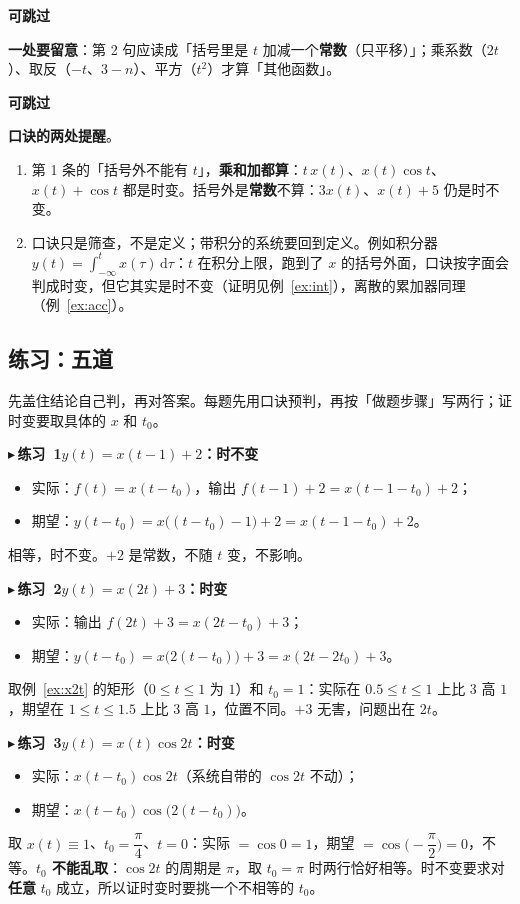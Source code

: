 \documentclass[UTF8,a4paper,11pt]{ctexart}
\newenvironment{skippable}{\begin{skipbox}\textbf{可跳过}\par\smallskip}{\end{skipbox}}
\newcounter{ex}[section]
\newcommand{\point}[1]{\par\addvspace{1ex}\noindent\textcolor{ptteal}{$\blacktriangleright$\,\textbf{#1}}\ }
\begin{document}
\begin{skippable}
\textbf{一处要留意}：第 2 句应读成「括号里是 $t$ 加减一个\textbf{常数}（只平移）」；乘系数（$2t$）、取反（$-t$、$3-n$）、平方（$t^2$）才算「其他函数」。
\end{skippable}

\begin{skippable}
\textbf{口诀的两处提醒}。
\begin{enumerate}[nosep]
\item 第 1 条的「括号外不能有 $t$」，\textbf{乘和加都算}：$t\,x(t)$、$x(t)\cos t$、$x(t)+\cos t$ 都是时变。括号外是\textbf{常数}不算：$3x(t)$、$x(t)+5$ 仍是时不变。
\item 口诀只是筛查，不是定义；带积分的系统要回到定义。例如积分器 $y(t)=\displaystyle\int_{-\infty}^{t}x(\tau)\,\mathrm{d}\tau$：$t$ 在积分上限，跑到了 $x$ 的括号外面，口诀按字面会判成时变，但它其实是时不变（证明见例~\ref{ex:int}），离散的累加器同理（例~\ref{ex:acc}）。
\end{enumerate}
\end{skippable}


\subsection{练习：五道}
先盖住结论自己判，再对答案。每题先用口诀预判，再按「做题步骤」写两行；证时变要取具体的 $x$ 和 $t_0$。

\point{练习~1\quad$y(t)=x(t-1)+2$：时不变}
\begin{itemize}[nosep]
\item 实际：$f(t)=x(t-t_0)$，输出 $f(t-1)+2=x(t-1-t_0)+2$；
\item 期望：$y(t-t_0)=x\bigl((t-t_0)-1\bigr)+2=x(t-1-t_0)+2$。
\end{itemize}
相等，时不变。$+2$ 是常数，不随 $t$ 变，不影响。

\point{练习~2\quad$y(t)=x(2t)+3$：时变}
\begin{itemize}[nosep]
\item 实际：输出 $f(2t)+3=x(2t-t_0)+3$；
\item 期望：$y(t-t_0)=x\bigl(2(t-t_0)\bigr)+3=x(2t-2t_0)+3$。
\end{itemize}
取例~\ref{ex:x2t} 的矩形（$0\le t\le1$ 为 $1$）和 $t_0=1$：实际在 $0.5\le t\le1$ 上比 $3$ 高 $1$，期望在 $1\le t\le1.5$ 上比 $3$ 高 $1$，位置不同。$+3$ 无害，问题出在 $2t$。

\point{练习~3\quad$y(t)=x(t)\cos 2t$：时变}
\begin{itemize}[nosep]
\item 实际：$x(t-t_0)\cos2t$（系统自带的 $\cos2t$ 不动）；
\item 期望：$x(t-t_0)\cos\bigl(2(t-t_0)\bigr)$。
\end{itemize}
取 $x(t)\equiv1$、$t_0=\dfrac{\pi}{4}$、$t=0$：实际 $=\cos0=1$，期望 $=\cos\bigl(-\dfrac{\pi}{2}\bigr)=0$，不等。\textbf{$t_0$ 不能乱取}：$\cos2t$ 的周期是 $\pi$，取 $t_0=\pi$ 时两行恰好相等。时不变要求对\textbf{任意} $t_0$ 成立，所以证时变时要挑一个不相等的 $t_0$。
\end{document}
